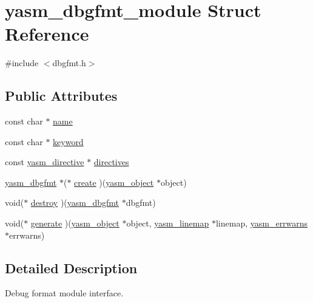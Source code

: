 \hypertarget{structyasm__dbgfmt__module}{\section{yasm\-\_\-dbgfmt\-\_\-module Struct Reference}
\label{structyasm__dbgfmt__module}
}


{\ttfamily \#include $<$dbgfmt.\-h$>$}

\subsection*{Public Attributes}
\begin{DoxyCompactItemize}
\item 
const char $\ast$ \hyperlink{structyasm__dbgfmt__module_a4cd6a734c7698c6fe9eead782be93ee6}{name}
\item 
const char $\ast$ \hyperlink{structyasm__dbgfmt__module_ad76bf17745eea63c499f92b49fec585e}{keyword}
\item 
const \hyperlink{structyasm__directive}{yasm\-\_\-directive} $\ast$ \hyperlink{structyasm__dbgfmt__module_a061ba535cfefaf4d51d05aca6b90058e}{directives}
\item 
\hyperlink{coretype_8h_ac8215052ae972b3462380abe1fa5291a}{yasm\-\_\-dbgfmt} $\ast$($\ast$ \hyperlink{structyasm__dbgfmt__module_aabd6277bd3da3ecf5446b41e77fa9848}{create} )(\hyperlink{structyasm__object}{yasm\-\_\-object} $\ast$object)
\item 
void($\ast$ \hyperlink{structyasm__dbgfmt__module_a490ee31a6d35fdfbddbf659badd6f2c0}{destroy} )(\hyperlink{coretype_8h_ac8215052ae972b3462380abe1fa5291a}{yasm\-\_\-dbgfmt} $\ast$dbgfmt)
\item 
void($\ast$ \hyperlink{structyasm__dbgfmt__module_a4ace328105e57a701188ad181b24ca54}{generate} )(\hyperlink{structyasm__object}{yasm\-\_\-object} $\ast$object, \hyperlink{structyasm__linemap}{yasm\-\_\-linemap} $\ast$linemap, \hyperlink{structyasm__errwarns}{yasm\-\_\-errwarns} $\ast$errwarns)
\end{DoxyCompactItemize}


\subsection{Detailed Description}
Debug format module interface. 

